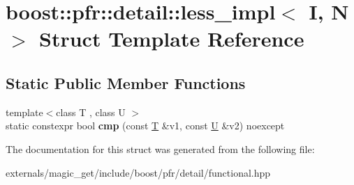 \hypertarget{structboost_1_1pfr_1_1detail_1_1less__impl}{}\section{boost\+:\+:pfr\+:\+:detail\+:\+:less\+\_\+impl$<$ I, N $>$ Struct Template Reference}
\label{structboost_1_1pfr_1_1detail_1_1less__impl}
\subsection*{Static Public Member Functions}
\begin{DoxyCompactItemize}
\item 
\mbox{\label{structboost_1_1pfr_1_1detail_1_1less__impl_a9c22394bfa8d485e02b7e52c1fcbecba}} 
{\footnotesize template$<$class T , class U $>$ }\\static constexpr bool {\bfseries cmp} (const \mbox{\hyperlink{struct_t}{T}} \&v1, const \mbox{\hyperlink{union_u}{U}} \&v2) noexcept
\end{DoxyCompactItemize}


The documentation for this struct was generated from the following file\+:\begin{DoxyCompactItemize}
\item 
externals/magic\+\_\+get/include/boost/pfr/detail/functional.\+hpp\end{DoxyCompactItemize}
